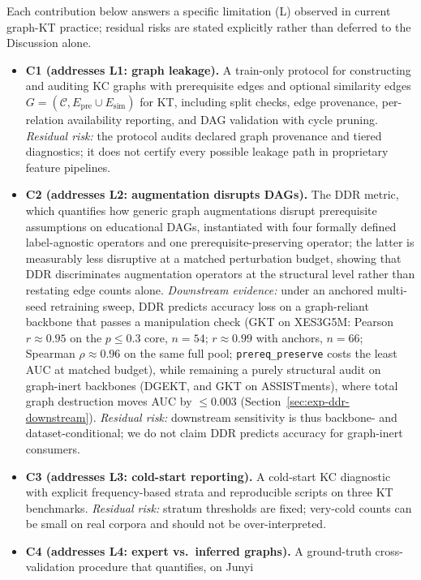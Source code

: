 \documentclass[pdflatex,sn-mathphys-num]{sn-jnl}
\newcommand{\Epre}{\ensuremath{E_{\text{pre}}}}
\newcommand{\Esim}{\ensuremath{E_{\text{sim}}}}
\newcommand{\DDR}{\textsc{DDR}}
\begin{document}
Each contribution below answers a specific limitation (L) observed in
current graph-KT practice; residual risks are stated explicitly rather
than deferred to the Discussion alone.
\begin{itemize}
  \item \textbf{C1 (addresses L1: graph leakage).} A train-only protocol
  for constructing and auditing KC graphs with prerequisite edges and
  optional similarity edges $G=(\mathcal{C}, \Epre \cup \Esim)$ for KT,
  including split checks, edge provenance, per-relation availability
  reporting, and DAG validation with cycle pruning.
  \emph{Residual risk:} the protocol audits declared graph provenance and
  tiered diagnostics; it does not certify every possible leakage path in
  proprietary feature pipelines.
  \item \textbf{C2 (addresses L2: augmentation disrupts DAGs).} The
  \DDR{} metric, which quantifies how generic graph augmentations disrupt
  prerequisite assumptions on educational DAGs, instantiated with four
  formally defined label-agnostic operators and one prerequisite-preserving
  operator; the latter is measurably less disruptive at a matched
  perturbation budget, showing that \DDR{} discriminates augmentation
  operators at the structural level rather than restating edge counts alone.
  \emph{Downstream evidence:} under an anchored multi-seed retraining sweep, \DDR{}
  predicts accuracy loss on a graph-reliant backbone that passes a
  manipulation check (GKT on XES3G5M: Pearson $r{\approx}0.95$ on the
  $p{\le}0.3$ core, $n{=}54$; $r{\approx}0.99$ with anchors, $n{=}66$;
  Spearman $\rho{\approx}0.96$ on the same full pool;
  \texttt{prereq\_preserve}
  costs the least AUC at matched budget), while remaining a purely structural
  audit on graph-inert backbones (DGEKT, and GKT on ASSISTments), where total
  graph destruction moves AUC by ${\le}0.003$ (Section~\ref{sec:exp-ddr-downstream}).
  \emph{Residual risk:} downstream sensitivity is thus backbone- and
  dataset-conditional; we do not claim \DDR{} predicts accuracy for graph-inert
  consumers.
  \item \textbf{C3 (addresses L3: cold-start reporting).} A cold-start KC
  diagnostic with explicit frequency-based strata and reproducible scripts
  on three KT benchmarks.
  \emph{Residual risk:} stratum thresholds are fixed; very-cold counts can
  be small on real corpora and should not be over-interpreted.
  \item \textbf{C4 (addresses L4: expert vs.\ inferred graphs).} A
  ground-truth cross-validation procedure that quantifies, on Junyi

\end{itemize}
\end{document}
